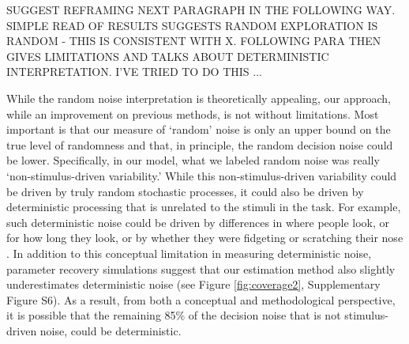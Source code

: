 \documentclass[12pt]{article}
\begin{document}
{%

SUGGEST REFRAMING NEXT PARAGRAPH IN THE FOLLOWING WAY.  SIMPLE READ OF RESULTS SUGGESTS RANDOM EXPLORATION IS RANDOM - THIS IS CONSISTENT WITH X.  FOLLOWING PARA THEN GIVES LIMITATIONS AND TALKS ABOUT DETERMINISTIC INTERPRETATION.  I'VE TRIED TO DO THIS ...




While the random noise interpretation is theoretically appealing, our approach, while an improvement on previous methods, is not without limitations. Most important is that our measure of `random' noise is only an upper bound on the true level of randomness and that, in principle, the random decision noise could be lower. Specifically, in our model, what we labeled random noise was really `non-stimulus-driven variability.' While this non-stimulus-driven variability could be driven by truly random stochastic processes, it could also be driven by deterministic processing that is unrelated to the stimuli in the task. For example, such deterministic noise could be driven by differences in where people look, or for how long they look, or by whether they were fidgeting or scratching their nose \citep{Musall2019}. In addition to this conceptual limitation in measuring deterministic noise, parameter recovery simulations suggest that our estimation method also slightly underestimates deterministic noise (see Figure \ref{fig:coverage2}, Supplementary Figure S6). As a result, from both a conceptual and methodological perspective, it is possible that the remaining 85\% of the decision noise that is not stimulus-driven noise, could be deterministic.

}
\end{document}
